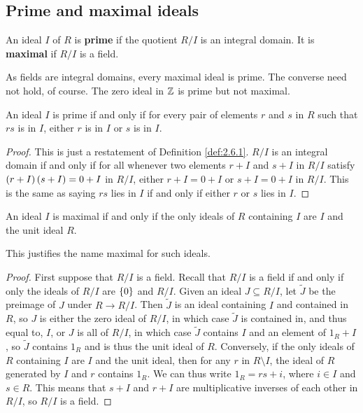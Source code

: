\subsection{Prime and maximal ideals}


\begin{definition}
\label{def:2.6.1}
An ideal $ I $ of $ R $ is \textbf{prime} if the quotient $ R / I $ is an integral domain. It is \textbf{maximal} if $ R / I $ is a field.
\end{definition}

\begin{note*}
As fields are integral domains, every maximal ideal is prime. The converse need not hold, of course. The zero ideal in $ \mathbb{Z} $ is prime but not maximal.
\end{note*}

\begin{lemma}
An ideal $ I $ is prime if and only if for every pair of elements $ r $ and $ s $ in $ R $ such that $ rs $ is in $ I $, either $ r $ is in $ I $ or $ s $ is in $ I $.
\end{lemma}

\begin{proof}
This is just a restatement of Definition \ref{def:2.6.1}. $ R / I $ is an integral domain if and only if for all whenever two elements $ r + I $ and $ s + I $ in $ R / I $ satisfy $ \br{r + I}\br{s + I} = 0 + I $ in $ R / I $, either $ r + I = 0 + I $ or $ s + I = 0 + I $ in $ R / I $. This is the same as saying $ rs $ lies in $ I $ if and only if either $ r $ or $ s $ lies in $ I $.
\end{proof}

\begin{lemma}
An ideal $ I $ is maximal if and only if the only ideals of $ R $ containing $ I $ are $ I $ and the unit ideal $ R $.
\end{lemma}

This justifies the name maximal for such ideals.

\begin{proof}
First suppose that $ R / I $ is a field. Recall that $ R / I $ is a field if and only if only the ideals of $ R / I $ are $ \cbr{0} $ and $ R / I $. Given an ideal $ J \subseteq R / I $, let $ \widetilde{J} $ be the preimage of $ J $ under $ R \to R / I $. Then $ \widetilde{J} $ is an ideal containing $ I $ and contained in $ R $, so $ J $ is either the zero ideal of $ R / I $, in which case $ \widetilde{J} $ is contained in, and thus equal to, $ I $, or $ J $ is all of $ R / I $, in which case $ \widetilde{J} $ contains $ I $ and an element of $ 1_R + I $, so $ \widetilde{J} $ contains $ 1_R $ and is thus the unit ideal of $ R $. Conversely, if the only ideals of $ R $ containing $ I $ are $ I $ and the unit ideal, then for any $ r $ in $ R \setminus I $, the ideal of $ R $ generated by $ I $ and $ r $ contains $ 1_R $. We can thus write $ 1_R = rs + i $, where $ i \in I $ and $ s \in R $. This means that $ s + I $ and $ r + I $ are multiplicative inverses of each other in $ R / I $, so $ R / I $ is a field.
\end{proof}

